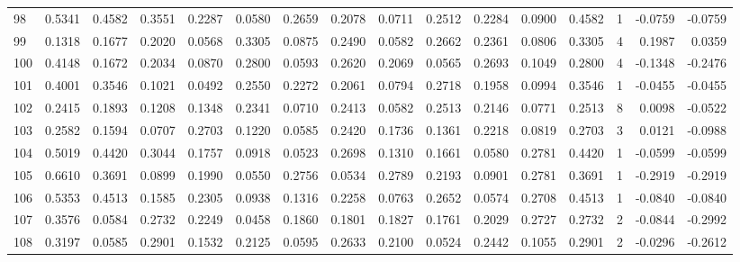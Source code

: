 \begin{tabular}{lrrrrrrrrrrrrrrr}
98  &      0.5341 &  0.4582 &  0.3551 &  0.2287 &  0.0580 &  0.2659 &  0.2078 &  0.0711 &  0.2512 &  0.2284 &   0.0900 &     0.4582 &      1 &                   -0.0759 &                    -0.0759 \\
99  &      0.1318 &  0.1677 &  0.2020 &  0.0568 &  0.3305 &  0.0875 &  0.2490 &  0.0582 &  0.2662 &  0.2361 &   0.0806 &     0.3305 &      4 &                    0.1987 &                     0.0359 \\
100 &      0.4148 &  0.1672 &  0.2034 &  0.0870 &  0.2800 &  0.0593 &  0.2620 &  0.2069 &  0.0565 &  0.2693 &   0.1049 &     0.2800 &      4 &                   -0.1348 &                    -0.2476 \\
101 &      0.4001 &  0.3546 &  0.1021 &  0.0492 &  0.2550 &  0.2272 &  0.2061 &  0.0794 &  0.2718 &  0.1958 &   0.0994 &     0.3546 &      1 &                   -0.0455 &                    -0.0455 \\
102 &      0.2415 &  0.1893 &  0.1208 &  0.1348 &  0.2341 &  0.0710 &  0.2413 &  0.0582 &  0.2513 &  0.2146 &   0.0771 &     0.2513 &      8 &                    0.0098 &                    -0.0522 \\
103 &      0.2582 &  0.1594 &  0.0707 &  0.2703 &  0.1220 &  0.0585 &  0.2420 &  0.1736 &  0.1361 &  0.2218 &   0.0819 &     0.2703 &      3 &                    0.0121 &                    -0.0988 \\
104 &      0.5019 &  0.4420 &  0.3044 &  0.1757 &  0.0918 &  0.0523 &  0.2698 &  0.1310 &  0.1661 &  0.0580 &   0.2781 &     0.4420 &      1 &                   -0.0599 &                    -0.0599 \\
105 &      0.6610 &  0.3691 &  0.0899 &  0.1990 &  0.0550 &  0.2756 &  0.0534 &  0.2789 &  0.2193 &  0.0901 &   0.2781 &     0.3691 &      1 &                   -0.2919 &                    -0.2919 \\
106 &      0.5353 &  0.4513 &  0.1585 &  0.2305 &  0.0938 &  0.1316 &  0.2258 &  0.0763 &  0.2652 &  0.0574 &   0.2708 &     0.4513 &      1 &                   -0.0840 &                    -0.0840 \\
107 &      0.3576 &  0.0584 &  0.2732 &  0.2249 &  0.0458 &  0.1860 &  0.1801 &  0.1827 &  0.1761 &  0.2029 &   0.2727 &     0.2732 &      2 &                   -0.0844 &                    -0.2992 \\
108 &      0.3197 &  0.0585 &  0.2901 &  0.1532 &  0.2125 &  0.0595 &  0.2633 &  0.2100 &  0.0524 &  0.2442 &   0.1055 &     0.2901 &      2 &                   -0.0296 &                    -0.2612 \\

\end{tabular}
